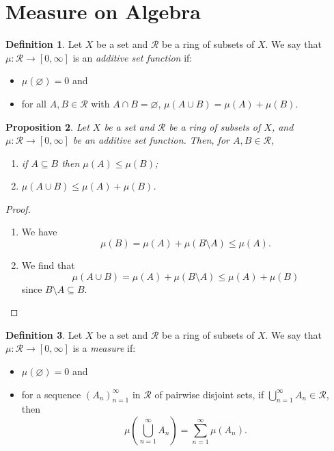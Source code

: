 \documentclass[a4paper, openany]{memoir}
\theoremstyle{definition}
\newtheorem{definition}{Definition}[section]
\theoremstyle{plain}
\newtheorem{proposition}[definition]{Proposition}
\begin{document}
    \newpage

    \section{Measure on Algebra}
    \begin{definition}
        Let $X$ be a set and $\mathcal{R}$ be a ring of subsets of $X$. We say that $\mu \colon \mathcal{R} \to [0, \infty]$ is an \emph{additive set function} if:
        \begin{itemize}
            \item $\mu(\varnothing) = 0$ and
            \item for all $A, B \in \mathcal{R}$ with $A \cap B = \varnothing$, $\mu(A \cup B) = \mu(A) + \mu(B)$.
        \end{itemize}
    \end{definition}

    \begin{proposition}
        Let $X$ be a set and $\mathcal{R}$ be a ring of subsets of $X$, and $\mu \colon \mathcal{R} \to [0, \infty]$ be an additive set function. Then, for $A, B \in \mathcal{R}$,
        \begin{enumerate}
            \item if $A \subseteq B$ then $\mu(A) \leq \mu(B)$;
            \item $\mu(A \cup B) \leq \mu(A) + \mu(B)$.
        \end{enumerate}
    \end{proposition}
    \begin{proof}
        \hspace{0pt}
        \begin{enumerate}
            \item We have
            \[\mu(B) = \mu(A) + \mu(B \setminus A) \leq \mu(A).\]
            \item We find that
            \[\mu(A \cup B) = \mu(A) + \mu(B \setminus A) \leq \mu(A) + \mu(B)\]
            since $B \setminus A \subseteq B$.
        \end{enumerate}
    \end{proof}

    \begin{definition}
        Let $X$ be a set and $\mathcal{R}$ be a ring of subsets of $X$. We say that $\mu \colon \mathcal{R} \to [0, \infty]$ is a \emph{measure} if:
        \begin{itemize}
            \item $\mu(\varnothing) = 0$ and
            \item for a sequence $(A_n)_{n=1}^\infty$ in $\mathcal{R}$ of pairwise disjoint sets, if $\bigcup_{n=1}^\infty A_n \in \mathcal{R}$, then
            \[\mu \left(\bigcup_{n=1}^\infty A_n\right) = \sum_{n=1}^\infty \mu(A_n).\]
        \end{itemize}
    \end{definition}
    
\end{document}
